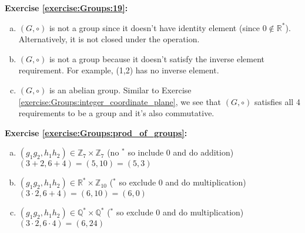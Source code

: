\noindent\textbf{Exercise \ref{exercise:Groups:19}:}
\begin{enumerate}[(a)]
\item
$(G, \circ)$ is not a group since it doesn't have identity element (since $ 0 \notin {\mathbb R}^*$). Alternatively, it is not closed under the operation.

\item
$(G, \circ)$ is not a group because it doesn't satisfy the inverse element requirement. For example, (1,2) has no inverse element.

\item
$(G, \circ)$ is an abelian group. Similar to Exercise \ref{exercise:Groups:integer_coordinate_plane}, we see that $(G, \circ)$ satisfies all 4 requirements to be a group and it's also commutative.
\end{enumerate}

\noindent\textbf{Exercise \ref{exercise:Groups:prod_of_groups}:}
\begin{enumerate}[(a)]
\item
$(g_1 g_2, h_1 h_2) \in {\mathbb Z}_7 \times {\mathbb Z}_7$ (no $^\ast$ so include 0 and do addition) \\
$(3 + 2, 6 + 4) = (5, 10) = (5, 3)$

\item
$(g_1 g_2, h_1 h_2) \in {\mathbb R}^{\ast} \times {\mathbb Z_{10}}$ ($^\ast$ so exclude 0 and do multiplication) \\
$(3 \cdot 2, 6 + 4) = (6, 10) = (6, 0)$

\item 
$(g_1 g_2, h_1 h_2) \in {\mathbb Q}^{\ast} \times {\mathbb Q}^{\ast}$ ($^\ast$ so exclude 0 and do multiplication) \\
$(3 \cdot 2, 6 \cdot 4) = (6, 24)$
\end{enumerate}

